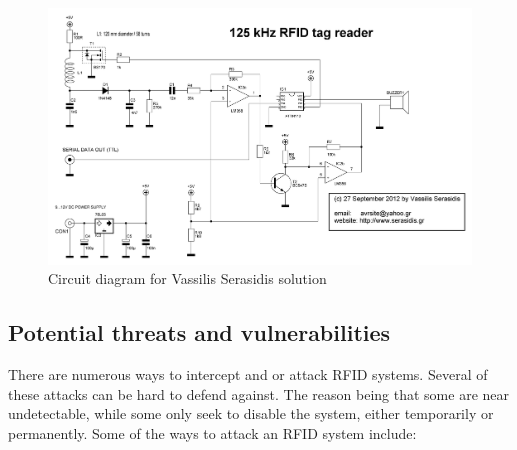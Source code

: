\begin{landscape}
 \begin{figure}
  \centering
  \includegraphics[width=1.5\textwidth]{02_Literature_study/figures/125kHz_RFID_reader_schem.png}
  \caption{Circuit diagram for Vassilis Serasidis solution}
  \label{fig:02:ATtiny13Circuit}
 \end{figure}
\end{landscape}

\newpage

\subsection{Potential threats and vulnerabilities}
There are numerous ways to intercept and or attack RFID systems. Several of these attacks can be hard to defend against. The reason being that some are near undetectable, while some only seek to disable the system, either temporarily or permanently. Some of the ways to attack an RFID system include:

